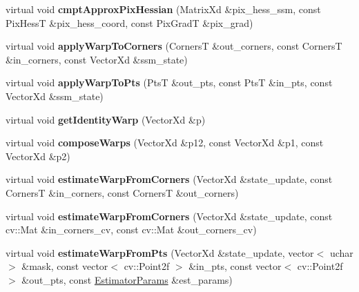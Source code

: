 \begin{DoxyCompactItemize}
\item 
\hypertarget{classStateSpaceModel_a635ed4245d0325ad070896579745df0c}{virtual void {\bfseries cmpt\-Approx\-Pix\-Hessian} (Matrix\-Xd \&pix\-\_\-hess\-\_\-ssm, const Pix\-Hess\-T \&pix\-\_\-hess\-\_\-coord, const Pix\-Grad\-T \&pix\-\_\-grad)}\label{classStateSpaceModel_a635ed4245d0325ad070896579745df0c}

\item 
\hypertarget{classStateSpaceModel_a9cfb7407a0293d3b04e0c4e661045aaf}{virtual void {\bfseries apply\-Warp\-To\-Corners} (Corners\-T \&out\-\_\-corners, const Corners\-T \&in\-\_\-corners, const Vector\-Xd \&ssm\-\_\-state)}\label{classStateSpaceModel_a9cfb7407a0293d3b04e0c4e661045aaf}

\item 
\hypertarget{classStateSpaceModel_a8706d6bd58546ef6d4958b6751e506fa}{virtual void {\bfseries apply\-Warp\-To\-Pts} (Pts\-T \&out\-\_\-pts, const Pts\-T \&in\-\_\-pts, const Vector\-Xd \&ssm\-\_\-state)}\label{classStateSpaceModel_a8706d6bd58546ef6d4958b6751e506fa}

\item 
\hypertarget{classStateSpaceModel_a5059ab244d444ff65d5aab2c8f3f3381}{virtual void {\bfseries get\-Identity\-Warp} (Vector\-Xd \&p)}\label{classStateSpaceModel_a5059ab244d444ff65d5aab2c8f3f3381}

\item 
\hypertarget{classStateSpaceModel_a0f84e175d6a10e46b14289ac7ef21df6}{virtual void {\bfseries compose\-Warps} (Vector\-Xd \&p12, const Vector\-Xd \&p1, const Vector\-Xd \&p2)}\label{classStateSpaceModel_a0f84e175d6a10e46b14289ac7ef21df6}

\item 
\hypertarget{classStateSpaceModel_ab36e25193912bf9432a7847b338b456a}{virtual void {\bfseries estimate\-Warp\-From\-Corners} (Vector\-Xd \&state\-\_\-update, const Corners\-T \&in\-\_\-corners, const Corners\-T \&out\-\_\-corners)}\label{classStateSpaceModel_ab36e25193912bf9432a7847b338b456a}

\item 
\hypertarget{classStateSpaceModel_ac35938433ae0b96dd8b782867c6def4f}{virtual void {\bfseries estimate\-Warp\-From\-Corners} (Vector\-Xd \&state\-\_\-update, const cv\-::\-Mat \&in\-\_\-corners\-\_\-cv, const cv\-::\-Mat \&out\-\_\-corners\-\_\-cv)}\label{classStateSpaceModel_ac35938433ae0b96dd8b782867c6def4f}

\item 
\hypertarget{classStateSpaceModel_ac7aa757a7e29ab961ff15bb5c71543cf}{virtual void {\bfseries estimate\-Warp\-From\-Pts} (Vector\-Xd \&state\-\_\-update, vector$<$ uchar $>$ \&mask, const vector$<$ cv\-::\-Point2f $>$ \&in\-\_\-pts, const vector$<$ cv\-::\-Point2f $>$ \&out\-\_\-pts, const \hyperlink{structSSMEstimatorParams}{Estimator\-Params} \&est\-\_\-params)}\label{classStateSpaceModel_ac7aa757a7e29ab961ff15bb5c71543cf}


\end{DoxyCompactItemize}
